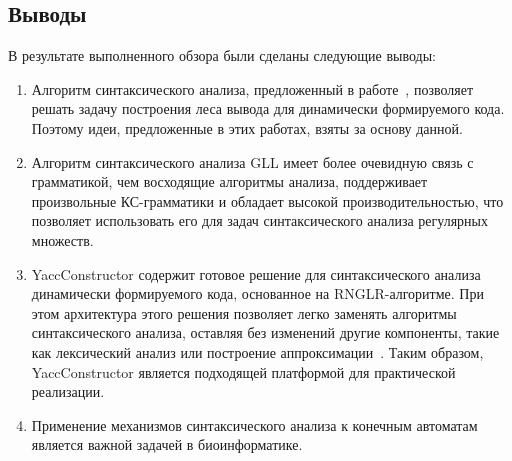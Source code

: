 \subsection{Выводы}
В результате выполненного обзора были сделаны следующие выводы:
\begin{enumerate}
\item Алгоритм синтаксического анализа, предложенный в работе~\cite{RelaxedARNGLR}, позволяет решать задачу построения леса вывода для динамически формируемого кода. Поэтому идеи, предложенные в этих работах, взяты за основу данной.
\item Алгоритм синтаксического анализа GLL имеет более очевидную связь с грамматикой, чем восходящие алгоритмы анализа, поддерживает произвольные КС-грамматики и обладает высокой производительностью, что позволяет использовать его для задач синтаксического анализа регулярных множеств.
\item YaccConstructor содержит готовое решение для синтаксического анализа динамически формируемого кода, основанное на RNGLR-алгоритме. При этом архитектура этого решения позволяет легко заменять алгоритмы синтаксического анализа, оставляя без изменений другие компоненты, такие как лексический анализ или построение аппроксимации~\cite{SELforIDE}. Таким образом, YaccConstructor является подходящей платформой для практической реализации.
\item Применение механизмов синтаксического анализа к конечным автоматам является важной задачей в биоинформатике.
\end{enumerate}
